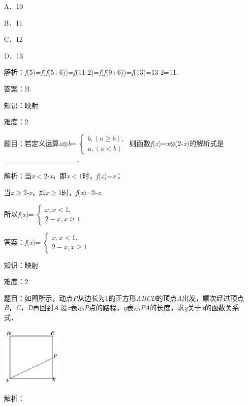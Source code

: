 \documentclass{article} %
\begin{document}
A．10　　　

B．11　　　

C．12　　　

D．13

解析：\textit{f}(5)=\textit{f}(\textit{f}(5+6))=\textit{f}(11-2)=\textit{f}(\textit{f}(9+6))=\textit{f}(13)=13-2=11.

答案：B.

知识：映射

难度：2

题目：若定义运算\textit{a}$\mathrm{\otimes}$\textit{b}=
$\left\{
\begin{array}{l}
	b,(a\ge b),\\
	a, (a<b)
\end{array}
\right.$
则函数\textit{f}(\textit{x})=\textit{x}$\mathrm{\otimes}$(2-\textit{x})的解析式是\_\_\_\_\_\_\_\_\_\_\_\_\_\_．

解析：当\textit{x}$\mathrm{<}$2-\textit{x}，即\textit{x}$\mathrm{<}$1时，\textit{f}(\textit{x})=\textit{x}；

当\textit{x}$\mathrm{\ge}$2-\textit{x}，即\textit{x}$\mathrm{\ge}$1时，\textit{f}(\textit{x})=2-\textit{x}.

所以\textit{f}(\textit{x})=
$\left\{
\begin{array}{l}
	x,x< 1,\\
	2-x,x\ge 1
\end{array}
\right.$


答案：\textit{f}(\textit{x})=
$\left\{
\begin{array}{l}
x,x< 1,\\
2-x,x\ge 1
\end{array}
\right.$

知识：映射

难度：2

题目：如图所示，动点\textit{P}从边长为1的正方形\textit{ABCD}的顶点\textit{A}出发，顺次经过顶点\textit{B}，\textit{C}，\textit{D}再回到\textit{A}.设\textit{x}表示\textit{P}点的路程，\textit{y}表示\textit{PA}的长度，求\textit{y}关于\textit{x}的函数关系式．

\includegraphics*[width=1.19in, height=1.18in, keepaspectratio=false]{image33}

解析：
\end{document}
